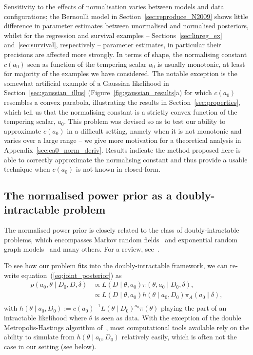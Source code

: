 \documentclass[a4paper, notitlepage, 11pt]{article}
\begin{document}
Sensitivity to the effects of normalisation varies between models and data configurations; the Bernoulli model in Section~\ref{sec:reproduce_N2009} shows little difference in parameter estimates between unormalised and normalised posteriors, whilst for the regression and survival examples -- Sections~\ref{sec:linreg_ex} and~\ref{sec:survival}, respectively -- parameter estimates, in particular their precisions are affected more strongly.
In terms of shape, the normalising constant $c(a_0)$ seen as function of the tempering scalar $a_0$ is usually monotonic, at least for majority of the examples we have considered.
The notable exception is the somewhat artificial example of a Gaussian likelihood in Section~\ref{sec:gaussian_illus} (Figure~\ref{fig:gaussian_results}a) for which $c(a_0)$ resembles a convex parabola, illustrating the results in Section~\ref{sec:properties}, which tell us that the normalising constant is a strictly convex function of the tempering scalar, $a_0$.
This problem was devised so as to test our ability to approximate $c(a_0)$ in a difficult setting, namely when it is not monotonic and varies over a large range -- we give more motivation for a theoretical analysis in Appendix~\ref{sec:ca0_norm_deriv}.
Results indicate the method proposed here is able to correctly approximate the normalising constant and thus provide a usable technique when $c(a_0)$ is not known in closed-form.

\subsection{The normalised power prior as a doubly-intractable problem}
\label{sec:doubly_intractable}

The normalised power prior is closely related to the class of doubly-intractable problems, which encompasses Markov random fields~\citep{Besag1974} and exponential random graph models~\citep{Robins2007} and many others.
For a review, see~\cite{Park2018}.

To see how our problem fits into the doubly-intractable framework, we can re-write equation~(\ref{eq:joint_posterior}) as  
\begin{align*}
 p(a_0, \theta \mid D_0, D, \delta) &\propto L(D \mid \theta, a_0) \pi(\theta, a_0 \mid D_0, \delta), \\
 &\propto L(D \mid \theta, a_0) h(\theta \mid a_0, D_0) \pi_A(a_0 \mid \delta),\\
\end{align*}
with $h(\theta \mid a_0, D_0) := c(a_0)^{-1} L(\theta \mid D_0)^{a_0}\pi(\theta)$ playing the part of an intractable likelihood where $\theta$ is seen as data.
With the exception of the double Metropolis-Hastings algorithm of~\cite{Liang2010}, most computational tools available rely on the ability to simulate from $h(\theta \mid a_0, D_0)$ relatively easily, which is often not the case in our setting (see below). 
\end{document}

